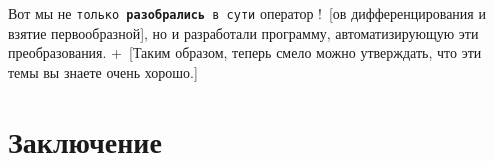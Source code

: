 \documentclass[a4paper,14pt, openany, twoside, draft]{extbook} %
\newcommand{\aaa}[2][acolor]{\noindent\textcolor{eclr}%
{+\ [}\textcolor{#1}{#2}\textcolor{eclr}{]}}
\newcommand{\nnn}[2][ncolor]{\noindent%
\textcolor{eclr}{!\ [}\textcolor{#1}{#2}\textcolor{eclr}{]}}
\begin{document}
Вот мы не \texttt{только \textbf{разобрались} в сути} оператор\nnn{ов дифференцирования и взятие первообразной}, но и разработали программу, автоматизирующую эти преобразования.  \aaa{Таким образом, теперь смело можно утверждать, что эти темы вы знаете очень хорошо.}




\chapter*{Заключение}
\end{document}
